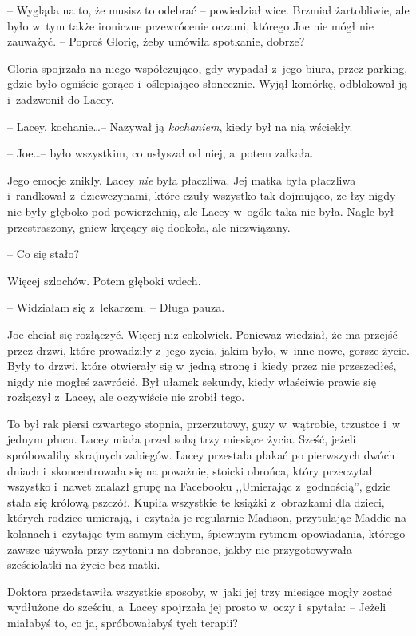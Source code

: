 \documentclass[oneside,polish,11pt,sfheadings]{mwbk}
\begin{document}
-- Wygląda na to, że musisz to odebrać -- powiedział wice. Brzmiał
żartobliwie, ale było w~tym także ironiczne przewrócenie oczami, którego
Joe nie mógł nie zauważyć. -- Poproś Glorię, żeby umówiła spotkanie,
dobrze?

Gloria spojrzała na niego współczująco, gdy wypadał z~jego biura, przez
parking, gdzie było ogniście gorąco i~oślepiająco słonecznie. Wyjął
komórkę, odblokował ją i~zadzwonił do Lacey.

-- Lacey, kochanie\ldots  -- Nazywał ją \textit{kochaniem}, kiedy był na nią
wściekły.

-- Joe\ldots  -- było wszystkim, co usłyszał od niej, a~potem załkała.

Jego emocje znikły. Lacey \textit{nie} była płaczliwa. Jej matka była
płaczliwa i~randkował z~dziewczynami, które czuły wszystko tak
dojmująco, że łzy nigdy nie były głęboko pod powierzchnią, ale Lacey w~ogóle taka nie była. Nagle był przestraszony, gniew kręcący się dookoła,
ale niezwiązany.

-- Co się stało?

Więcej szlochów. Potem głęboki wdech. 

-- Widziałam się z~lekarzem. -- Długa pauza. 

Joe chciał się rozłączyć. Więcej niż cokolwiek. Ponieważ
wiedział, że ma przejść przez drzwi, które prowadziły z~jego życia,
jakim było, w~inne nowe, gorsze życie. Były to drzwi, które otwierały
się w~jedną stronę i~kiedy przez nie przeszedłeś, nigdy nie mogłeś
zawrócić. Był ułamek sekundy, kiedy właściwie prawie się rozłączył z~Lacey, ale oczywiście nie zrobił tego.

To był rak piersi czwartego stopnia, przerzutowy, guzy w~wątrobie,
trzustce i~w jednym płucu. Lacey miała przed sobą trzy miesiące życia.
Sześć, jeżeli spróbowaliby skrajnych zabiegów. Lacey przestała płakać po
pierwszych dwóch dniach i~skoncentrowała się na poważnie, stoicki
obrońca, który przeczytał wszystko i~nawet znalazł grupę na Facebooku
,,Umierając z~godnością'', gdzie stała się królową pszczół. Kupiła
wszystkie te książki z~obrazkami dla dzieci, których rodzice umierają, i~czytała je regularnie Madison, przytulając Maddie na kolanach i~czytając
tym samym cichym, śpiewnym rytmem opowiadania, którego zawsze używała
przy czytaniu na dobranoc, jakby nie przygotowywała sześciolatki na
życie bez matki.

Doktora przedstawiła wszystkie sposoby, w~jaki jej trzy miesiące mogły
zostać wydłużone do sześciu, a~Lacey spojrzała jej prosto w~oczy i~spytała: -- Jeżeli miałabyś to, co ja, spróbowałabyś tych terapii?
\end{document}
